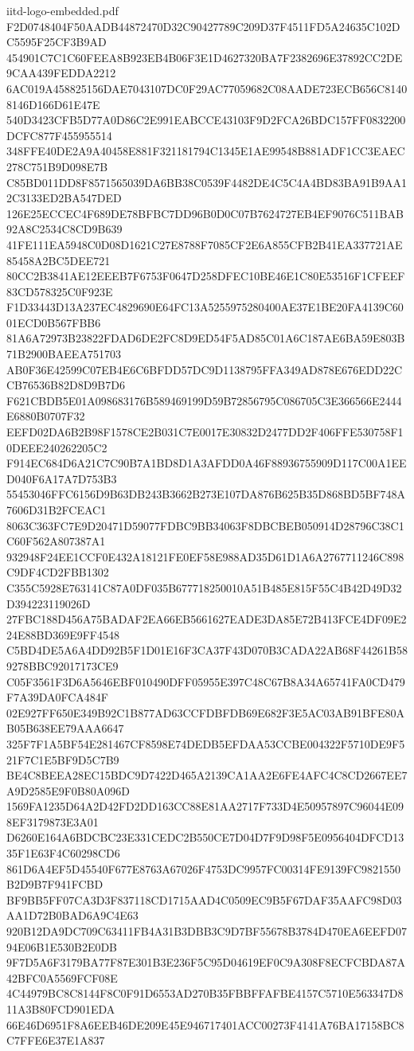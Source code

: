 \begin{filecontents*}[overwrite]{iitd-logo-embedded.pdf}
F2D0748404F50AADB44872470D32C90427789C209D37F4511FD5A24635C102DC5595F25CF3B9AD
454901C7C1C60FEEA8B923EB4B06F3E1D4627320BA7F2382696E37892CC2DE9CAA439FEDDA2212
6AC019A458825156DAE7043107DC0F29AC77059682C08AADE723ECB656C81408146D166D61E47E
540D3423CFB5D77A0D86C2E991EABCCE43103F9D2FCA26BDC157FF0832200DCFC877F455955514
348FFE40DE2A9A40458E881F321181794C1345E1AE99548B881ADF1CC3EAEC278C751B9D098E7B
C85BD011DD8F8571565039DA6BB38C0539F4482DE4C5C4A4BD83BA91B9AA12C3133ED2BA547DED
126E25ECCEC4F689DE78BFBC7DD96B0D0C07B7624727EB4EF9076C511BAB92A8C2534C8CD9B639
41FE111EA5948C0D08D1621C27E8788F7085CF2E6A855CFB2B41EA337721AE85458A2BC5DEE721
80CC2B3841AE12EEEB7F6753F0647D258DFEC10BE46E1C80E53516F1CFEEF83CD578325C0F923E
F1D33443D13A237EC4829690E64FC13A5255975280400AE37E1BE20FA4139C6001ECD0B567FBB6
81A6A72973B23822FDAD6DE2FC8D9ED54F5AD85C01A6C187AE6BA59E803B71B2900BAEEA751703
AB0F36E42599C07EB4E6C6BFDD57DC9D1138795FFA349AD878E676EDD22CCB76536B82D8D9B7D6
F621CBDB5E01A098683176B589469199D59B72856795C086705C3E366566E2444E6880B0707F32
EEFD02DA6B2B98F1578CE2B031C7E0017E30832D2477DD2F406FFE530758F10DEEE240262205C2
F914EC684D6A21C7C90B7A1BD8D1A3AFDD0A46F88936755909D117C00A1EED040F6A17A7D753B3
55453046FFC6156D9B63DB243B3662B273E107DA876B625B35D868BD5BF748A7606D31B2FCEAC1
8063C363FC7E9D20471D59077FDBC9BB34063F8DBCBEB050914D28796C38C1C60F562A807387A1
932948F24EE1CCF0E432A18121FE0EF58E988AD35D61D1A6A2767711246C898C9DF4CD2FBB1302
C355C5928E763141C87A0DF035B677718250010A51B485E815F55C4B42D49D32D394223119026D
27FBC188D456A75BADAF2EA66EB5661627EADE3DA85E72B413FCE4DF09E224E88BD369E9FF4548
C5BD4DE5A6A4DD92B5F1D01E16F3CA37F43D070B3CADA22AB68F44261B589278BBC92017173CE9
C05F3561F3D6A5646EBF010490DFF05955E397C48C67B8A34A65741FA0CD479F7A39DA0FCA484F
02E927FF650E349B92C1B877AD63CCFDBFDB69E682F3E5AC03AB91BFE80AB05B638EE79AAA6647
325F7F1A5BF54E281467CF8598E74DEDB5EFDAA53CCBE004322F5710DE9F521F7C1E5BF9D5C7B9
BE4C8BEEA28EC15BDC9D7422D465A2139CA1AA2E6FE4AFC4C8CD2667EE7A9D2585E9F0B80A096D
1569FA1235D64A2D42FD2DD163CC88E81AA2717F733D4E50957897C96044E098EF3179873E3A01
D6260E164A6BDCBC23E331CEDC2B550CE7D04D7F9D98F5E0956404DFCD1335F1E63F4C60298CD6
861D6A4EF5D45540F677E8763A67026F4753DC9957FC00314FE9139FC9821550B2D9B7F941FCBD
BF9BB5FF07CA3D3F837118CD1715AAD4C0509EC9B5F67DAF35AAFC98D03AA1D72B0BAD6A9C4E63
920B12DA9DC709C63411FB4A31B3DBB3C9D7BF55678B3784D470EA6EEFD0794E06B1E530B2E0DB
9F7D5A6F3179BA77F87E301B3E236F5C95D04619EF0C9A308F8ECFCBDA87A42BFC0A5569FCF08E
4C44979BC8C8144F8C0F91D6553AD270B35FBBFFAFBE4157C5710E563347D811A3B80FCD901EDA
66E46D6951F8A6EEB46DE209E45E946717401ACC00273F4141A76BA17158BC8C7FFE6E37E1A837

\end{filecontents*}
